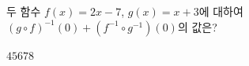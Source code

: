\hspace*{2mm}\begin{minipage}[t]{\dimexpr\linewidth-2mm\relax}\vspace{0pt}
두 함수 $f(x)=2x-7$, $g(x)=x+3$에 대하여 $(g\circ f)^{-1}(0)+(f^{-1}\circ g^{-1})(0)$의 값은?
\begin{choices32}{$4$}{$5$}{$6$}{$7$}{$8$}\end{choices32}\end{minipage}
